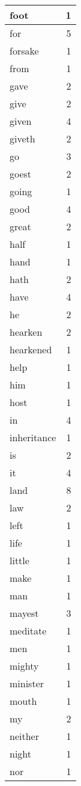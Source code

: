 \begin{center}
\begin{longtable}{l|r}
foot & 1 \\ \hline
for & 5 \\ \hline
forsake & 1 \\ \hline
from & 1 \\ \hline
gave & 2 \\ \hline
give & 2 \\ \hline
given & 4 \\ \hline
giveth & 2 \\ \hline
go & 3 \\ \hline
goest & 2 \\ \hline
going & 1 \\ \hline
good & 4 \\ \hline
great & 2 \\ \hline
half & 1 \\ \hline
hand & 1 \\ \hline
hath & 2 \\ \hline
have & 4 \\ \hline
he & 2 \\ \hline
hearken & 2 \\ \hline
hearkened & 1 \\ \hline
help & 1 \\ \hline
him & 1 \\ \hline
host & 1 \\ \hline
in & 4 \\ \hline
inheritance & 1 \\ \hline
is & 2 \\ \hline
it & 4 \\ \hline
land & 8 \\ \hline
law & 2 \\ \hline
left & 1 \\ \hline
life & 1 \\ \hline
little & 1 \\ \hline
make & 1 \\ \hline
man & 1 \\ \hline
mayest & 3 \\ \hline
meditate & 1 \\ \hline
men & 1 \\ \hline
mighty & 1 \\ \hline
minister & 1 \\ \hline
mouth & 1 \\ \hline
my & 2 \\ \hline
neither & 1 \\ \hline
night & 1 \\ \hline
nor & 1 \\ \hline

\end{longtable}
\end{center}
